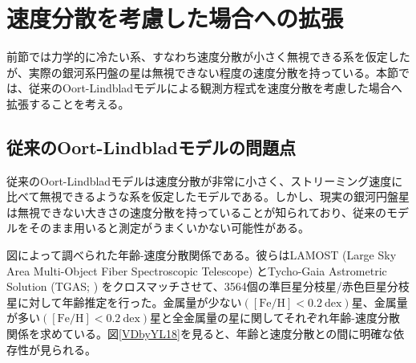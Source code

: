 
\section{速度分散を考慮した場合への拡張} %
前節では力学的に冷たい系、すなわち速度分散が小さく無視できる系を仮定したが、実際の銀河系円盤の星は無視できない程度の速度分散を持っている。本節では、従来のOort-Lindbladモデルによる観測方程式を速度分散を考慮した場合へ拡張することを考える。

\subsection{従来のOort-Lindbladモデルの問題点} %
従来のOort-Lindbladモデルは速度分散が非常に小さく、ストリーミング速度に比べて無視できるような系を仮定したモデルである。しかし、現実の銀河円盤星は無視できない大きさの速度分散を持っていることが知られており、従来のモデルをそのまま用いると測定がうまくいかない可能性がある。

図\cite{YL18}によって調べられた年齢-速度分散関係である。彼らはLAMOST (Large Sky Area Multi-Object Fiber Spectroscopic Telescope) とTycho-Gaia Astrometric Solution (TGAS; \cite{Gaia2016}) をクロスマッチさせて、3564個の準巨星分枝星/赤色巨星分枝星に対して年齢推定を行った。金属量が少ない$([\mathrm{Fe}/\mathrm{H}] < 0.2\ \mathrm{dex})$星、金属量が多い$([\mathrm{Fe}/\mathrm{H}] < 0.2\ \mathrm{dex})$星と全金属量の星に関してそれぞれ年齢-速度分散関係を求めている。図\ref{VDbyYL18}を見ると、年齢と速度分散との間に明確な依存性が見られる。

